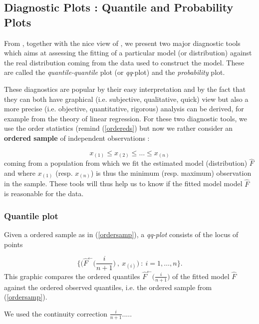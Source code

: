 \documentclass[11pt,a4paper,openany ]{book}
\begin{document}
\subsection{Diagnostic Plots : Quantile and Probability Plots}
From \citet[pp.18-36]{beirlant_practical_1996}, together with the nice view of \citet[pp.36-37]{coles_introduction_2001}, we present two major diagnostic tools which aims at assessing the fitting of a particular model (or distribution) against the real distribution coming from the data used to construct the model.
These are called the \emph{quantile-quantile} plot (or \emph{qq}-plot) and the \emph{probability} plot. 

These diagnostics are popular by their easy interpretation and by the fact that they can both have graphical (i.e. subjective, qualitative, quick) view but also a more precise (i.e. objective, quantitative, rigorous) analysis can be derived, for example from the theory of linear regression. 
\newline
For these two diagnostic tools, we use the order statistics (remind (\ref{ordereds}) but now we rather consider an \textbf{ordered sample} of independent observations :

\begin{equation} \label{ordersamp}
x_{(1)}\leq x_{(2)}\leq\dots\leq x_{(n)}
\end{equation}
coming from a population from which we fit the estimated model (distribution) $\hat{F}$ and where $x_{(1)}$ (resp. $x_{(n)}$) is thus the minimum (resp. maximum) observation in the sample. These tools will thus help us to know if the fitted model model $\hat{F}$ is reasonable for the data.

\subsubsection*{Quantile plot} Given a ordered sample as in (\ref{ordersamp}), a \emph{qq-plot} consists of the locus of points 

\begin{equation}
\Bigg\{\bigg(\hat{F}^{\leftarrow}\Big(\frac{i}{n+1}\Big)\ ,\ x_{(i)}\bigg) \ : \ i=1,\dots,n\Bigg\}.
\end{equation}
This graphic compares the ordered quantiles $\hat{F}^{\leftarrow}\Big(\frac{i}{n+1}\Big)$ of the fitted model $\hat{F}$ against the ordered observed quantiles, i.e. the ordered sample from (\ref{ordersamp}).

We used the continuity correction $\frac{i}{n+1}$.....
\end{document}
